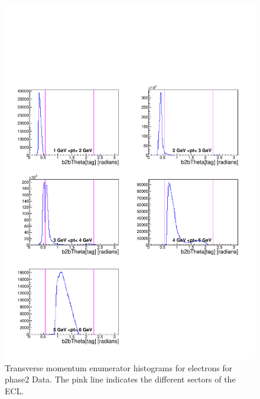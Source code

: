 \documentclass[a4paper,11pt,twosided,final,german,openbib,pdftex,listof=totoc,bibliography=totoc]{scrbook}
\begin{document}
\begin{appendix}
\begin{figure}[!htbp]
	\centering
	\includegraphics[width=\textwidth]{Plots/master/xPtMThetaemE_Data}
	\caption[Transverse Momentum $\theta$ Electron Enumerator Histogram Phase2 Data]{Transverse momentum enumerator histograms for electrons for phase2 Data. The pink line indicates the different sectors of the ECL.}
	\label{plt:PtMThetaemE_Data}
\end{figure}



\end{appendix}
\end{document}
